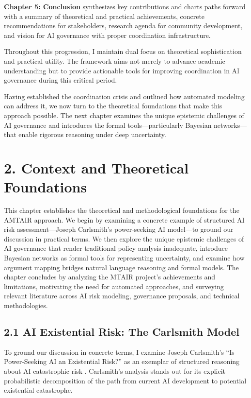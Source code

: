 \documentclass[
  11pt,
  letterpaper,
  openany]{book}
\begin{document}
\textbf{Chapter 5: Conclusion} synthesizes key contributions and charts
paths forward with a summary of theoretical and practical achievements,
concrete recommendations for stakeholders, research agenda for community
development, and vision for AI governance with proper coordination
infrastructure.

Throughout this progression, I maintain dual focus on theoretical
sophistication and practical utility. The framework aims not merely to
advance academic understanding but to provide actionable tools for
improving coordination in AI governance during this critical period.

Having established the coordination crisis and outlined how automated
modeling can address it, we now turn to the theoretical foundations that
make this approach possible. The next chapter examines the unique
epistemic challenges of AI governance and introduces the formal
tools---particularly Bayesian networks---that enable rigorous reasoning
under deep uncertainty.


\chapter{2. Context and Theoretical
Foundations}\label{context-and-theoretical-foundations}

This chapter establishes the theoretical and methodological foundations
for the AMTAIR approach. We begin by examining a concrete example of
structured AI risk assessment---Joseph Carlsmith's power-seeking AI
model---to ground our discussion in practical terms. We then explore the
unique epistemic challenges of AI governance that render traditional
policy analysis inadequate, introduce Bayesian networks as formal tools
for representing uncertainty, and examine how argument mapping bridges
natural language reasoning and formal models. The chapter concludes by
analyzing the MTAIR project's achievements and limitations, motivating
the need for automated approaches, and surveying relevant literature
across AI risk modeling, governance proposals, and technical
methodologies.

\section{2.1 AI Existential Risk: The Carlsmith
Model}\label{ai-existential-risk-the-carlsmith-model}

To ground our discussion in concrete terms, I examine Joseph Carlsmith's
``Is Power-Seeking AI an Existential Risk?'' as an exemplar of
structured reasoning about AI catastrophic risk
\textcite{carlsmith2022}. Carlsmith's analysis stands out for its
explicit probabilistic decomposition of the path from current AI
development to potential existential catastrophe.
\end{document}
